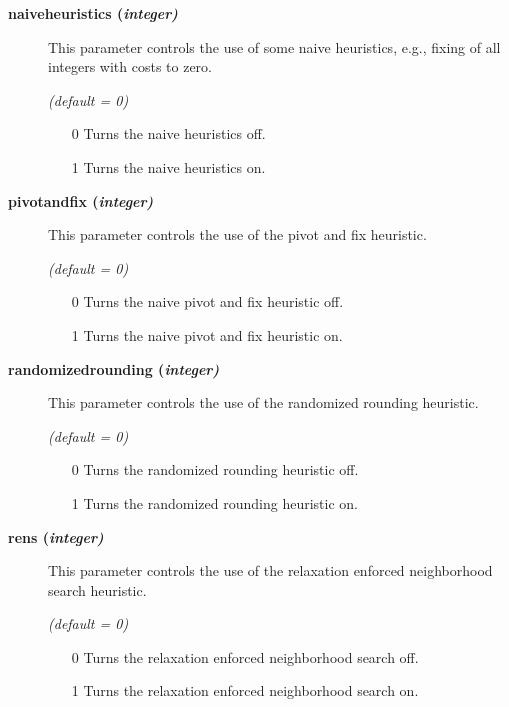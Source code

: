 \begin{description}
\item[\label{naiveheuristics}\hypertarget{naiveheuristics}
{\textbf{naiveheuristics (\slshape{integer})}}]\hspace{1.0in}

This parameter controls the use of some naive heuristics, e.g., fixing of all integers with costs to zero.

\textsl{(default = 0)}
\begin{itemize}
\item[0] 
Turns the naive heuristics off.
\item[1] 
Turns the naive heuristics on.
\end{itemize}

\item[\label{pivotandfix}\hypertarget{pivotandfix}
{\textbf{pivotandfix (\slshape{integer})}}]\hspace{1.0in}

This parameter controls the use of the pivot and fix heuristic.

\textsl{(default = 0)}
\begin{itemize}
\item[0]
Turns the naive pivot and fix heuristic off.
\item[1]
Turns the naive pivot and fix heuristic on.
\end{itemize}

\item[\label{randomizedrounding}\hypertarget{randomizedrounding}
{\textbf{randomizedrounding (\slshape{integer})}}]\hspace{1.0in}

This parameter controls the use of the randomized rounding heuristic.

\textsl{(default = 0)}
\begin{itemize}
\item[0] 
Turns the randomized rounding heuristic off.
\item[1] 
Turns the randomized rounding heuristic on.
\end{itemize}

\item[\label{rens}\hypertarget{rens}
{\textbf{rens (\slshape{integer})}}]\hspace{1.0in}

This parameter controls the use of the relaxation enforced neighborhood search heuristic.

\textsl{(default = 0)}
\begin{itemize}
\item[0] 
Turns the relaxation enforced neighborhood search off.
\item[1] 
Turns the relaxation enforced neighborhood search on.
\end{itemize}


\end{description}
